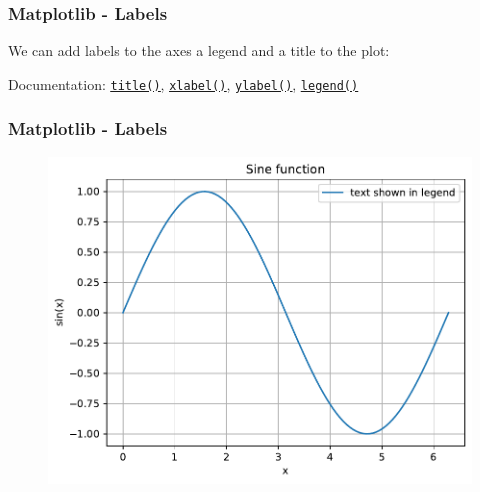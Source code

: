 \documentclass{beamer}
\newcommand{\hrefu}[2]{\underline{\href{#1}{#2}}}
\begin{document}
\begin{frame}
  \frametitle{Matplotlib - Labels}
  We can add labels to the axes a legend and a title to the plot:
  
  Documentation: \hrefu{https://matplotlib.org/stable/api/_as_gen/matplotlib.pyplot.title.html}{\texttt{title()}}, \hrefu{https://matplotlib.org/stable/api/_as_gen/matplotlib.pyplot.xlabel.html}{\texttt{xlabel()}}, \hrefu{https://matplotlib.org/stable/api/_as_gen/matplotlib.pyplot.ylabel.html}{\texttt{ylabel()}}, \hrefu{https://matplotlib.org/stable/api/_as_gen/matplotlib.pyplot.legend.html}{\texttt{legend()}}
\end{frame}

\begin{frame}
  \frametitle{Matplotlib - Labels}
  \begin{figure}[H]
    \centering
    \begin{samepage}
        \includegraphics[width=0.7\linewidth]{fig/matplotlib1.pdf}
    \end{samepage}
\end{figure}
\end{frame}
\end{document}
